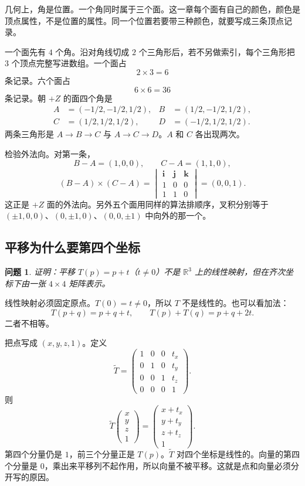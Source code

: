 \documentclass[12pt,a4paper]{article}
\theoremstyle{definition}
\theoremstyle{plain}
\newtheorem{problem}{问题}[section]
\theoremstyle{remark}
\begin{document}
几何上，角是位置。一个角同时属于三个面。这一章每个面有自己的颜色，颜色是顶点属性，不是位置的属性。同一个位置若要带三种颜色，就要写成三条顶点记录。

一个面先有 $4$ 个角。沿对角线切成 $2$ 个三角形后，若不另做索引，每个三角形把 $3$ 个顶点完整写进数组。一个面占
\[
2\times 3=6
\]
条记录。六个面占
\[
6\times 6=36
\]
条记录。朝 $+Z$ 的面四个角是
\begin{align*}
A&=(-1/2,-1/2,1/2),&
B&=(1/2,-1/2,1/2),\\
C&=(1/2,1/2,1/2),&
D&=(-1/2,1/2,1/2).
\end{align*}
两条三角形是 $A\to B\to C$ 与 $A\to C\to D$。$A$ 和 $C$ 各出现两次。

检验外法向。对第一条，
\[
B-A=(1,0,0),\qquad C-A=(1,1,0),
\]
\[
(B-A)\times(C-A)
=\begin{vmatrix}
\mathbf i&\mathbf j&\mathbf k\\
1&0&0\\
1&1&0
\end{vmatrix}
=(0,0,1).
\]
这正是 $+Z$ 面的外法向。另外五个面用同样的算法排顺序，叉积分别等于 $(\pm 1,0,0)$、$(0,\pm 1,0)$、$(0,0,\pm 1)$ 中向外的那一个。

\subsection{平移为什么要第四个坐标}

\begin{problem}
证明：平移 $T(p)=p+t$（$t\neq 0$）不是 $\mathbb{R}^3$ 上的线性映射，但在齐次坐标下由一张 $4\times 4$ 矩阵表示。
\end{problem}

线性映射必须固定原点。$T(0)=t\neq 0$，所以 $T$ 不是线性的。也可以看加法：
\[
T(p+q)=p+q+t,\qquad T(p)+T(q)=p+q+2t.
\]
二者不相等。

把点写成 $(x,y,z,1)$。定义
\[
\tilde T=
\begin{pmatrix}
1&0&0&t_x\\
0&1&0&t_y\\
0&0&1&t_z\\
0&0&0&1
\end{pmatrix}.
\]
则
\[
\tilde T\begin{pmatrix}x\\y\\z\\1\end{pmatrix}
=\begin{pmatrix}x+t_x\\ y+t_y\\ z+t_z\\ 1\end{pmatrix}.
\]
第四个分量仍是 $1$，前三个分量正是 $T(p)$。$\tilde T$ 对四个坐标是线性的。向量的第四个分量是 $0$，乘出来平移列不起作用，所以向量不被平移。这就是点和向量必须分开写的原因。
\end{document}
